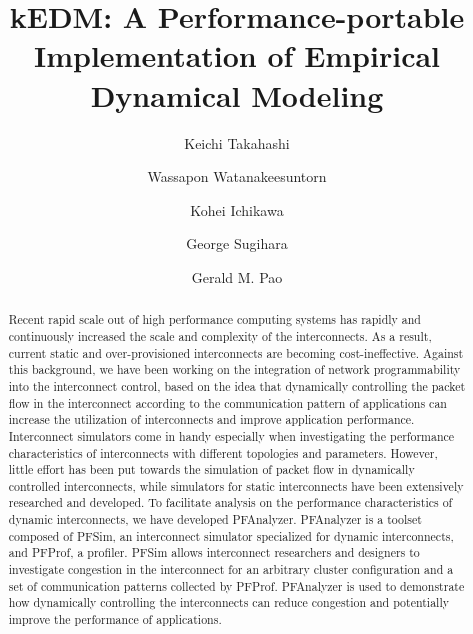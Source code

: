 \documentclass[sigconf]{acmart}
\begin{document}


\title{kEDM: A Performance-portable Implementation of Empirical Dynamical Modeling}

\author{Keichi Takahashi}
\author{Wassapon Watanakeesuntorn}
\author{Kohei Ichikawa}

\author{George Sugihara}

\author{Gerald M. Pao}

\begin{abstract}
Recent rapid scale out of high performance computing systems has
rapidly and continuously increased the scale and complexity of the
interconnects. As a result, current static and over-provisioned
interconnects are becoming cost-ineffective. Against this background, we have
been working on the integration of network programmability into
the interconnect control, based on the idea that dynamically controlling
the packet flow in the interconnect according to the communication pattern
of applications can increase the utilization of interconnects and improve
application performance. Interconnect simulators come in handy especially
when investigating the performance characteristics of interconnects with
different topologies and parameters. However, little effort has been put
towards the simulation of packet flow in dynamically controlled interconnects,
while simulators for static interconnects have been extensively researched
and developed. To facilitate analysis on the performance
characteristics of dynamic interconnects, we have developed PFAnalyzer.
PFAnalyzer is a toolset composed of PFSim, an interconnect simulator
specialized for dynamic interconnects, and PFProf, a profiler.
PFSim allows interconnect researchers and designers to investigate
congestion in the interconnect for an arbitrary cluster configuration and
a set of communication patterns collected by PFProf. PFAnalyzer is used
to demonstrate how dynamically controlling the interconnects can reduce
congestion and potentially improve the performance of applications.
\end{abstract}
\end{document}

